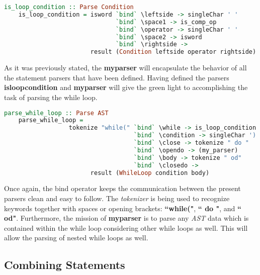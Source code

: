 \documentclass[a4paper, onecolumn]{article}
\begin{document}
    \begin{tcolorbox}
    \begin{lstlisting}[language=Haskell] 
    is_loop_condition :: Parse Condition
    is_loop_condition = isword `bind` \leftside -> singleChar ' ' 
                               `bind` \space1 -> is_comp_op 
                               `bind` \operator -> singleChar ' ' 
                               `bind` \space2 -> isword 
                               `bind` \rightside -> 
                        result (Condition leftside operator rightside)
    \end{lstlisting}
    \end{tcolorbox}
    
    \noindent As it was previously stated, the \textbf{my\textunderscore parser} will encapsulate the behavior of all the statement parsers that have been defined. Having defined the parsers \textbf{is\textunderscore loop\textunderscore condition} and \textbf{my\textunderscore parser} will give the green light to accomplishing the task of parsing the while loop.
    
    \begin{tcolorbox}
    \begin{lstlisting}[language=Haskell] 
    parse_while_loop :: Parse AST
    parse_while_loop = 
                  tokenize "while(" `bind` \while -> is_loop_condition
                                    `bind` \condition -> singleChar ')' 
                                    `bind` \close -> tokenize " do " 
                                    `bind` \opendo -> (my_parser) 
                                    `bind` \body -> tokenize " od" 
                                    `bind` \closedo ->
                        result (WhileLoop condition body)
    \end{lstlisting}
    \end{tcolorbox}
    
    \noindent Once again, the bind operator keeps the communication between the present parsers clean and easy to follow. The \textit{tokenizer} is being used to recognize keywords together with spaces or opening brackets: \textbf{``while("}, \textbf{`` do "}, and \textbf{`` od"}. Furthermore, the mission of \textbf{my\textunderscore parser} is to parse any \textit{AST} data which is contained within the while loop considering other while loops as well. This will allow the parsing of nested while loops as well.  
    
    \subsection{Combining Statements}
    
\end{document}
